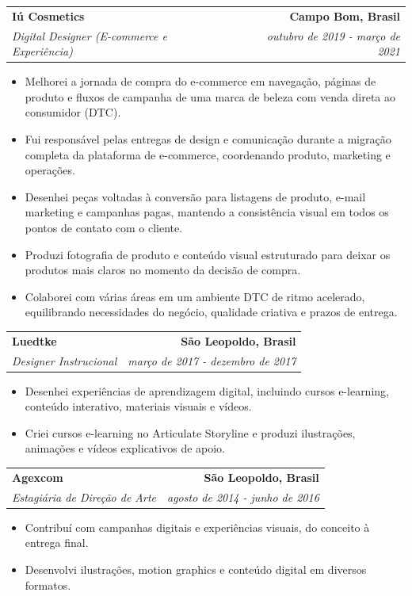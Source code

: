 \documentclass[a4paper,10pt]{article}
\makeatletter
\newcommand{\entry}[4]{%
  \begin{tabularx}{\textwidth}{@{}X r@{}}

    \textbf{\large #1} & \textbf{\large #2} \\
    \textit{#3} & \textit{#4} \\
  \end{tabularx}\vspace{1pt}}
\newenvironment{items}{\begin{itemize}[leftmargin=26pt,itemsep=3pt,parsep=0pt,topsep=0pt,partopsep=0pt,label=\textbullet]}{\end{itemize}\vspace{8pt}}
\makeatother
\begin{document}
\entry{Iú Cosmetics}{Campo Bom, Brasil}{Digital Designer (E-commerce e Experiência)}{outubro de 2019 - março de 2021}
\begin{items}
  \item Melhorei a jornada de compra do e-commerce em navegação, páginas de produto e fluxos de campanha de uma marca de beleza com venda direta ao consumidor (DTC).
  \item Fui responsável pelas entregas de design e comunicação durante a migração completa da plataforma de e-commerce, coordenando produto, marketing e operações.
  \item Desenhei peças voltadas à conversão para listagens de produto, e-mail marketing e campanhas pagas, mantendo a consistência visual em todos os pontos de contato com o cliente.
  \item Produzi fotografia de produto e conteúdo visual estruturado para deixar os produtos mais claros no momento da decisão de compra.
  \item Colaborei com várias áreas em um ambiente DTC de ritmo acelerado, equilibrando necessidades do negócio, qualidade criativa e prazos de entrega.
\end{items}

\entry{Luedtke}{São Leopoldo, Brasil}{Designer Instrucional}{março de 2017 - dezembro de 2017}
\begin{items}
  \item Desenhei experiências de aprendizagem digital, incluindo cursos e-learning, conteúdo interativo, materiais visuais e vídeos.
  \item Criei cursos e-learning no Articulate Storyline e produzi ilustrações, animações e vídeos explicativos de apoio.
\end{items}

\entry{Agexcom}{São Leopoldo, Brasil}{Estagiária de Direção de Arte}{agosto de 2014 - junho de 2016}
\begin{items}
  \item Contribuí com campanhas digitais e experiências visuais, do conceito à entrega final.
  \item Desenvolvi ilustrações, motion graphics e conteúdo digital em diversos formatos.
\end{items}
\end{document}
